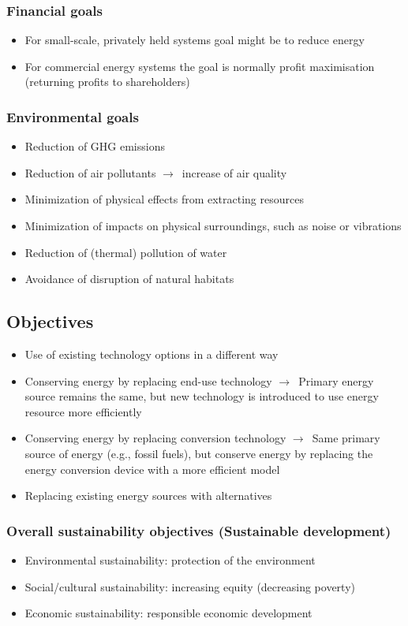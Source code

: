 \documentclass{article}
\begin{document}
\subsubsection{Financial goals}
\begin{itemize}
    \item For small-scale, privately held systems goal might be to reduce energy
    \item For commercial energy systems the goal is normally profit maximisation (returning profits to shareholders)
\end{itemize}

\subsubsection{Environmental goals}
\begin{itemize}
    \item Reduction of GHG emissions
    \item Reduction of air pollutants $\to$\ increase of air quality
    \item Minimization of physical effects from extracting resources
    \item Minimization of impacts on physical surroundings, such as noise or vibrations
    \item Reduction of (thermal) pollution of water
    \item Avoidance of disruption of natural habitats
\end{itemize}

\subsection{Objectives}
\begin{itemize}
    \item Use of existing technology options in a different way
    \item Conserving energy by replacing end-use technology $\to$\ Primary energy source remains the same, but new technology is introduced to use energy resource more efficiently
    \item Conserving energy by replacing conversion technology $\to$\ Same primary source of energy (e.g., fossil fuels), but conserve energy by replacing the energy conversion device with a more efficient model
    \item Replacing existing energy sources with alternatives
\end{itemize}

\subsubsection{Overall sustainability objectives (Sustainable development)}
\begin{itemize}
    \item Environmental sustainability: protection of the environment
    \item Social/cultural sustainability: increasing equity (decreasing poverty)
    \item Economic sustainability: responsible economic development
\end{itemize}
\end{document}
